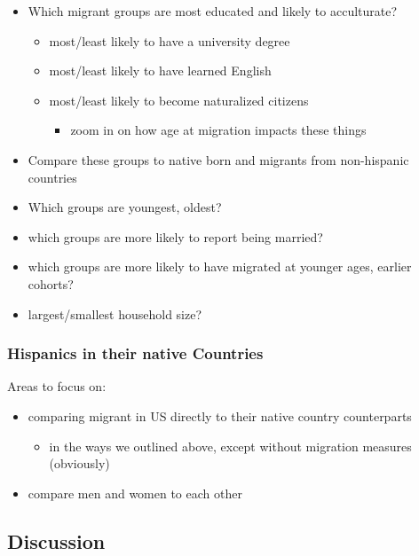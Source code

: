 \documentclass[
]{article}
\providecommand{\tightlist}{%
  \setlength{\itemsep}{0pt}\setlength{\parskip}{0pt}}\usepackage{longtable,booktabs,array}
\begin{document}
\begin{itemize}
\item
  Which migrant groups are most educated and likely to acculturate?

  \begin{itemize}
  \item
    most/least likely to have a university degree
  \item
    most/least likely to have learned English
  \item
    most/least likely to become naturalized citizens

    \begin{itemize}
    \tightlist
    \item
      zoom in on how age at migration impacts these things
    \end{itemize}
  \end{itemize}
\item
  Compare these groups to native born and migrants from non-hispanic
  countries
\item
  Which groups are youngest, oldest?
\item
  which groups are more likely to report being married?
\item
  which groups are more likely to have migrated at younger ages, earlier
  cohorts?
\item
  largest/smallest household size?
\end{itemize}

\subsubsection{Hispanics in their native
Countries}\label{hispanics-in-their-native-countries}

Areas to focus on:

\begin{itemize}
\item
  comparing migrant in US directly to their native country counterparts

  \begin{itemize}
  \tightlist
  \item
    in the ways we outlined above, except without migration measures
    (obviously)
  \end{itemize}
\item
  compare men and women to each other
\end{itemize}

\subsection{Discussion}\label{sec-discussion}
\end{document}
